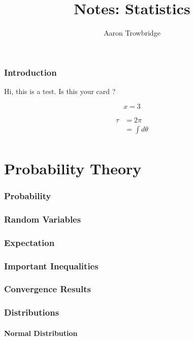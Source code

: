 \documentclass{article}
\title{Notes: Statistics}
\author{Aaron Trowbridge}
\date{}
\begin{document}
\maketitle

\tableofcontents
\newpage



\section{Introduction}

Hi, this is a test. Is this your card \As?


\begin{equation}
     x = 3 
\end{equation}

\begin{align*}
 \tau &= 2\pi \\ 
      &= \int d\theta \\
\end{align*}

\newpage
\part{Probability Theory}
\section{Probability}
\section{Random Variables}
\section{Expectation}
\section{Important Inequalities}
\section{Convergence Results}
\section{Distributions}
\subsection{Normal Distribution}
\end{document}

